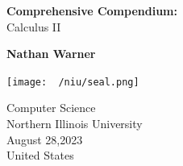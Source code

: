 \documentclass{report}
\title{\Huge{}}
\author{\huge{Nathan Warner}}
\date{\huge{}}
\begin{document}
        \begin{titlepage}
       \begin{center}
           \vspace*{1cm}
    
           \textbf{Comprehensive Compendium:} \\
            Calculus II
    
           \vspace{0.5cm}
            
                
           \vspace{1.5cm}
    
           \textbf{Nathan Warner}
    
           \vfill
                
                
           \vspace{0.8cm}
         
           \texttt{[image: ~/niu/seal.png]}
                
           Computer Science \\
           Northern Illinois University\\
           August 28,2023 \\
           United States\\
           
                
       \end{center}
    \end{titlepage}
    \tableofcontents
    \pagebreak \bigbreak \noindent
    \bigbreak \noindent 

    \bigbreak \noindent 
\end{document}
